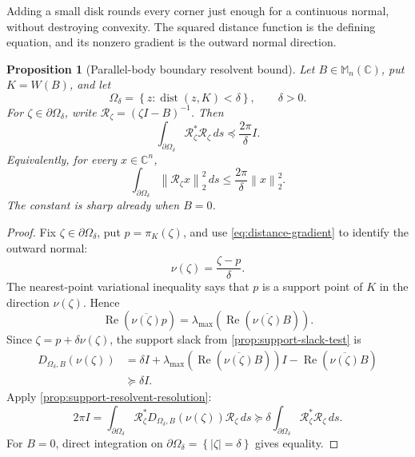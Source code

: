 \documentclass[11pt,oneside,openany]{book}
\newtheorem{proposition}[theorem]{Proposition}
\theoremstyle{definition}
\theoremstyle{remark}
\newcommand{\C}{\mathbb C}
\newcommand{\Mn}{\mathbb M_n(\C)}
\newcommand{\dist}{\operatorname{dist}}
\newcommand{\RePart}{\operatorname{Re}}
\newcommand{\norm}[1]{\left\lVert #1\right\rVert}
\newcommand{\set}[1]{\left\{#1\right\}}
\begin{document}
\begin{intuitionbox}
Adding a small disk rounds every corner just enough for a continuous
normal, without destroying convexity.  The squared distance function
is the defining equation, and its nonzero gradient is the outward
normal direction.
\end{intuitionbox}

\begin{proposition}[Parallel-body boundary resolvent bound]
\label{prop:parallel-resolvent-bound}
Let \(B\in\Mn\), put \(K=W(B)\), and let
\[
  \Omega_\delta=\set{z:\dist(z,K)<\delta},
  \qquad \delta>0.
\]
For \(\zeta\in\partial\Omega_\delta\), write
\(\mathcal R_\zeta=(\zeta I-B)^{-1}\).  Then
\begin{equation}
  \int_{\partial\Omega_\delta}
  \mathcal R_\zeta^*\mathcal R_\zeta\,ds
  \preceq\frac{2\pi}{\delta}I.
  \label{eq:parallel-resolvent-bound}
\end{equation}
Equivalently, for every \(x\in\C^n\),
\[
  \int_{\partial\Omega_\delta}
  \norm{\mathcal R_\zeta x}_2^2\,ds
  \leq\frac{2\pi}{\delta}\norm{x}_2^2.
\]
The constant is sharp already when \(B=0\).
\end{proposition}

\begin{proof}
Fix \(\zeta\in\partial\Omega_\delta\), put
\(p=\pi_K(\zeta)\), and use \eqref{eq:distance-gradient} to identify
the outward normal:
\[
  \nu(\zeta)=\frac{\zeta-p}{\delta}.
\]
The nearest-point variational inequality says that \(p\) is a support
point of \(K\) in the direction \(\nu(\zeta)\).  Hence
\[
  \RePart(\overline{\nu(\zeta)}p)
  =
  \lambda_{\max}
  \left(\RePart(\overline{\nu(\zeta)}B)\right).
\]
Since \(\zeta=p+\delta\nu(\zeta)\), the support slack from
\cref{prop:support-slack-test} is
\begin{align*}
  D_{\Omega_\delta,B}(\nu(\zeta))
  &=
  \delta I+
  \lambda_{\max}
  \left(\RePart(\overline{\nu(\zeta)}B)\right)I
  -\RePart(\overline{\nu(\zeta)}B)\\
  &\succeq\delta I.
\end{align*}
Apply \cref{prop:support-resolvent-resolution}:
\[
  2\pi I
  =
  \int_{\partial\Omega_\delta}
  \mathcal R_\zeta^*
  D_{\Omega_\delta,B}(\nu(\zeta))
  \mathcal R_\zeta\,ds
  \succeq
  \delta
  \int_{\partial\Omega_\delta}
  \mathcal R_\zeta^*\mathcal R_\zeta\,ds.
\]
For \(B=0\), direct integration on
\(\partial\Omega_\delta=\set{|\zeta|=\delta}\) gives equality.
\end{proof}
\end{document}
